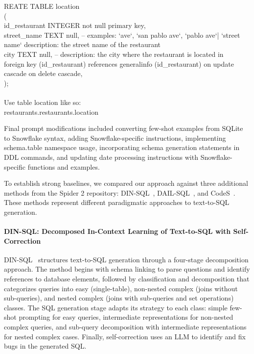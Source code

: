 \documentclass{article} %
\newcounter{promptcounter}
\newenvironment{promptbox}[2]{%
    \refstepcounter{promptcounter}%
    \label{#1}%
    \begin{tcolorbox}[
        colback=promptbg,
        colframe=promptborder,
        coltitle=white,
        colbacktitle=promptborder,
        title={\textbf{Prompt \thepromptcounter: #2}},
        fonttitle=\sffamily\bfseries,
        enhanced,
        breakable,
        attach boxed title to top left={yshift=-2mm, xshift=2mm},
        boxed title style={rounded corners},
        rounded corners,
        drop shadow,
        left=4pt,
        right=4pt,
        top=6pt,
        bottom=6pt
    ]%
}{%
    \end{tcolorbox}%
}
\begin{document}
\begin{promptbox}{prompt:system}
CREATE TABLE location \\
( \\
    \hspace*{1cm} id\_restaurant INTEGER not null primary key, \\
    \hspace*{1cm} street\_name TEXT null, -- examples: `ave`, `san pablo ave`, `pablo ave`| `street name` description: the street name of the restaurant \\
    \hspace*{1cm} city TEXT null, -- description: the city where the restaurant is located in \\
    \hspace*{1cm} foreign key (id\_restaurant) references generalinfo (id\_restaurant) on update cascade on delete cascade, \\
); \\
\\
Use table location like so: \\
restaurants.restaurants.location
\end{promptbox}

Final prompt modifications included converting few-shot examples from SQLite to Snowflake syntax, adding Snowflake-specific instructions, implementing schema.table namespace usage, incorporating schema generation statements in DDL commands, and updating date processing instructions with Snowflake-specific functions and examples.





To establish strong baselines, we compared our approach against three additional methods from the Spider 2 repository: DIN-SQL~\citep{pourreza2024din}, DAIL-SQL~\citep{gao2023text}, and CodeS~\citep{CodeS}. These methods represent different paradigmatic approaches to text-to-SQL generation.

\paragraph{DIN-SQL: Decomposed In-Context Learning of Text-to-SQL with Self-Correction}

DIN-SQL~\citep{pourreza2024din} structures text-to-SQL generation through a four-stage decomposition approach. The method begins with {schema linking} to parse questions and identify references to database elements, followed by {classification and decomposition} that categorizes queries into easy (single-table), non-nested complex (joins without sub-queries), and nested complex (joins with sub-queries and set operations) classes. The {SQL generation} stage adapts its strategy to each class: simple few-shot prompting for easy queries, intermediate representations for non-nested complex queries, and sub-query decomposition with intermediate representations for nested complex cases. Finally, {self-correction} uses an LLM to identify and fix bugs in the generated SQL.
\end{document}
